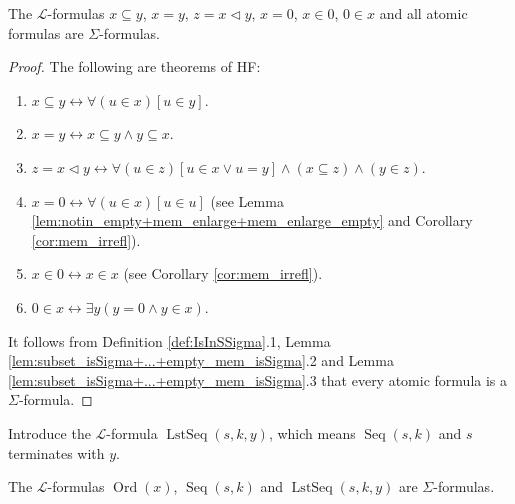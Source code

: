 \begin{lemma}
    \label{lem:subset_isSigma+...+empty_mem_isSigma}
    \leanok
    The $\mathcal{L}$-formulas $x \subseteq y$, $x = y$, $z = x \lhd y$, $x=0$, $x\in 0$,
    $0 \in x$ and all atomic formulas are $\Sigma$-formulas.
\end{lemma}

\begin{proof}
    The following are theorems of HF:
    \begin{enumerate}
        \item $x \subseteq y \leftrightarrow \forall (u \in x)[u \in y]$.
        \item $x = y \leftrightarrow x \subseteq y \land y \subseteq x$.
        \item $z = x \lhd y \leftrightarrow \forall(u \in z)[u \in x \lor u = y] 
        \land (x \subseteq z) \land (y \in z)$.
        \item $x = 0 \leftrightarrow \forall (u \in x)[u \in u]$ (see Lemma 
        \ref{lem:notin_empty+mem_enlarge+mem_enlarge_empty} and Corollary \ref{cor:mem_irrefl}).
        \item $x \in 0 \leftrightarrow x \in x$ (see Corollary \ref{cor:mem_irrefl}).
        \item $0 \in x \leftrightarrow \exists y (y = 0 \land y \in x)$.
    \end{enumerate}
    It follows from Definition \ref{def:IsInSSigma}.1, 
    Lemma \ref{lem:subset_isSigma+...+empty_mem_isSigma}.2 and 
    Lemma \ref{lem:subset_isSigma+...+empty_mem_isSigma}.3 that every atomic formula is a
    $\Sigma$-formula.
\end{proof}

\begin{lemma}
    \label{lem:Ord_isSigma+Seq_isSigma+LstSeq_isSigma}
    Introduce the $\mathcal{L}$-formula $\operatorname{LstSeq}(s,k,y)$, which means
    $\operatorname{Seq}(s,k)$ and $s$ terminates with $y$.
    
    The $\mathcal{L}$-formulas $\operatorname{Ord}(x)$, $\operatorname{Seq}(s,k)$ and
    $\operatorname{LstSeq}(s,k,y)$ are $\Sigma$-formulas.
\end{lemma}

